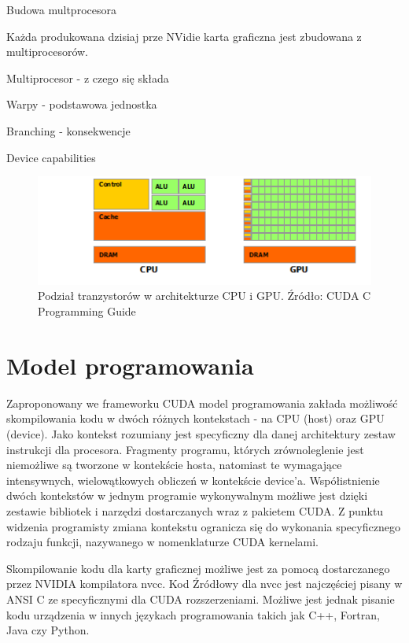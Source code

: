 Budowa multprocesora

Każda produkowana dzisiaj prze NVidie karta graficzna jest zbudowana z
multiprocesorów. 

Multiprocesor - z czego się składa 

Warpy - podstawowa jednostka

Branching - konsekwencje

Device capabilities



\begin{figure}[ht]\label{cpugpu}
\centering
\includegraphics{images/gpu-devotes-more-transistors-to-data-processing.png}
\caption{Podział tranzystorów w architekturze CPU i GPU. Źródło: CUDA C Programming Guide}
\end{figure}


\section{Model programowania}

Zaproponowany we frameworku CUDA model programowania zakłada możliwość
skompilowania kodu w dwóch różnych kontekstach - na CPU (host) oraz GPU
(device). Jako kontekst rozumiany jest specyficzny dla danej architektury zestaw
instrukcji dla procesora. Fragmenty programu, których zrównoleglenie jest
niemożliwe są tworzone w kontekście hosta, natomiast te wymagające intensywnych,
wielowątkowych obliczeń w kontekście device'a. Współistnienie dwóch
kontekstów w jednym programie wykonywalnym możliwe jest dzięki zestawie
bibliotek i narzędzi dostarczanych wraz z pakietem CUDA. Z punktu widzenia
programisty zmiana kontekstu ogranicza się do wykonania specyficznego
rodzaju funkcji, nazywanego w nomenklaturze CUDA kernelami.

Skompilowanie kodu dla karty graficznej możliwe jest za pomocą dostarczanego
przez NVIDIA kompilatora nvcc. Kod Źródłowy dla nvcc jest najczęściej pisany w
ANSI C ze specyficznymi dla CUDA rozszerzeniami. Możliwe jest jednak pisanie
kodu urządzenia w innych językach programowania takich jak C++, Fortran, Java
czy Python. 

